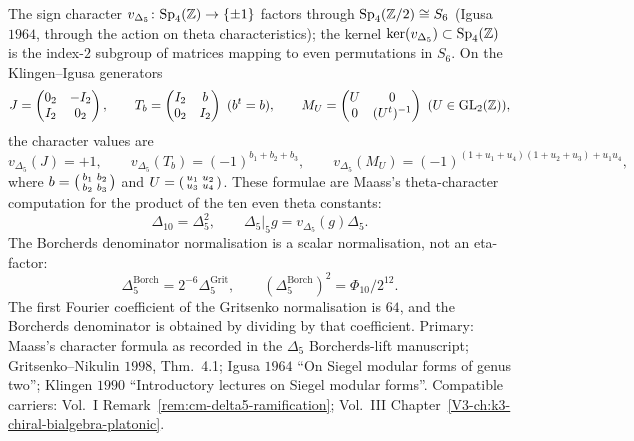 \begin{remark}
\label{rem:pivpi-vDelta5-chartable}
The sign character
$v_{\Delta_5} \colon \mathrm{Sp}_4(\mathbb{Z}) \to \{\pm 1\}$ factors through
$\mathrm{Sp}_4(\mathbb{Z}/2) \cong S_6$ (Igusa $1964$, through the action on
theta characteristics); the kernel
$\ker(v_{\Delta_5}) \subset \mathrm{Sp}_4(\mathbb{Z})$ is the index-$2$
subgroup of matrices mapping to even permutations in $S_6$. On the
Klingen--Igusa generators
\[
 J = \begin{pmatrix} 0_2 & -I_2 \\ I_2 & 0_2 \end{pmatrix},\qquad
 T_b = \begin{pmatrix} I_2 & b \\ 0_2 & I_2 \end{pmatrix}\ (b^t = b),\qquad
 M_U = \begin{pmatrix} U & 0 \\ 0 & (U^t)^{-1} \end{pmatrix}\ (U \in \mathrm{GL}_2(\mathbb{Z})),
\]
the character values are
\[
 v_{\Delta_5}(J) = +1,\qquad
 v_{\Delta_5}(T_b) = (-1)^{b_1+b_2+b_3},\qquad
 v_{\Delta_5}(M_U)
 = (-1)^{(1+u_1+u_4)(1+u_2+u_3)+u_1u_4},
\]
where $b=\begin{psmallmatrix} b_1&b_2\\ b_2&b_3\end{psmallmatrix}$
and $U=\begin{psmallmatrix}u_1&u_2\\ u_3&u_4\end{psmallmatrix}$.
These formulae are Maass's theta-character computation for the product
of the ten even theta constants:
\[
 \Delta_{10}=\Delta_5^2,\qquad
 \Delta_5\vert_5 g=v_{\Delta_5}(g)\Delta_5.
\]
The Borcherds denominator normalisation is a scalar normalisation, not
an eta-factor:
\[
 \Delta_5^{\mathrm{Borch}}
 = 2^{-6}\Delta_5^{\mathrm{Grit}},\qquad
 (\Delta_5^{\mathrm{Borch}})^2=\Phi_{10}/2^{12}.
\]
The first Fourier coefficient of the Gritsenko normalisation is $64$,
and the Borcherds denominator is obtained by dividing by that coefficient.
Primary: Maass's character formula as recorded in the
$\Delta_5$ Borcherds-lift manuscript; Gritsenko--Nikulin $1998$,
Thm.~4.1; Igusa $1964$ ``On Siegel modular forms of genus two'';
Klingen $1990$ ``Introductory lectures on Siegel modular forms''.
Compatible carriers: Vol.~I Remark~\ref{rem:cm-delta5-ramification};
Vol.~III
Chapter~\ref{V3-ch:k3-chiral-bialgebra-platonic}.
\end{remark}

